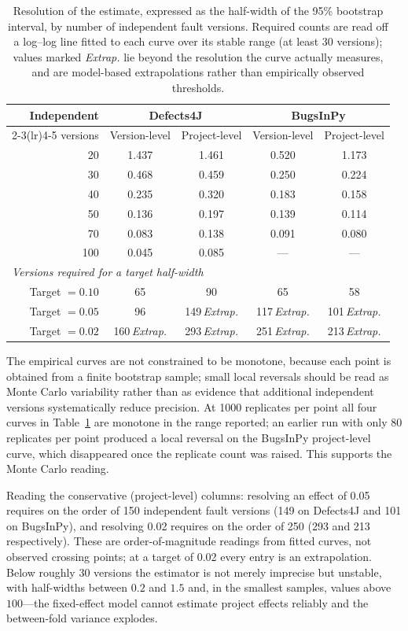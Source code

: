\documentclass[preprint,12pt]{elsarticle}
\begin{document}
\begin{table}[t]
\centering
\caption{Resolution of the estimate, expressed as the half-width of the 95\% bootstrap interval, by number of independent fault versions. Required counts are read off a log--log line fitted to each curve over its stable range (at least \num{30} versions); values marked
{\emph{Extrap.}} lie beyond the resolution the curve actually measures, and are model-based extrapolations rather than empirically observed thresholds.}
\label{tab:mde}
\begin{tabular}{rcccc}
\toprule
Independent & \multicolumn{2}{c}{Defects4J} & \multicolumn{2}{c}{BugsInPy} \\
\cmidrule(lr){2-3}\cmidrule(lr){4-5}
versions & Version-level & Project-level & Version-level & Project-level \\
\midrule
 20 & 1.437 & 1.461 & 0.520 & 1.173 \\
 30 & 0.468 & 0.459 & 0.250 & 0.224 \\
 40 & 0.235 & 0.320 & 0.183 & 0.158 \\
 50 & 0.136 & 0.197 & 0.139 & 0.114 \\
 70 & 0.083 & 0.138 & 0.091 & 0.080 \\
100 & 0.045 & 0.085 & --- & --- \\
\midrule
\multicolumn{5}{l}{\emph{Versions required for a target half-width}} \\
Target $=0.10$ & 65 & 90 & 65 & 58 \\
Target $=0.05$ & 96 & 149\emph{\,Extrap.} & 117\emph{\,Extrap.} & 101\emph{\,Extrap.} \\
Target $=0.02$ & 160\emph{\,Extrap.} & 293\emph{\,Extrap.} & 251\emph{\,Extrap.} & 213\emph{\,Extrap.} \\
\bottomrule
\end{tabular}
\end{table}

The empirical curves are not constrained to be monotone, because each
point is obtained from a finite bootstrap sample; small local reversals
should be read as Monte Carlo variability rather than as evidence that
additional independent versions systematically reduce precision. At
\num{1000} replicates per point all four curves in Table~\ref{tab:mde} are
monotone in the range reported; an earlier run with only $80$ replicates
per point produced a local reversal on the BugsInPy project-level curve,
which disappeared once the replicate count was raised. This supports the
Monte Carlo reading.

Reading the conservative (project-level) columns: resolving an effect of
\num{0.05} requires on the order of \num{150} independent fault versions
(\num{149} on Defects4J and \num{101} on BugsInPy), and resolving
\num{0.02} requires on the order of \num{250} (\num{293} and \num{213}
respectively). These are order-of-magnitude
readings from fitted curves, not observed crossing points; at a target of
\num{0.02} every entry is an extrapolation.
Below roughly
30 versions the estimator is not merely imprecise but unstable, with
half-widths between $0.2$ and $1.5$ and, in the smallest samples, values
above $100$---the fixed-effect model cannot estimate
project effects reliably and the between-fold variance explodes.
\end{document}

